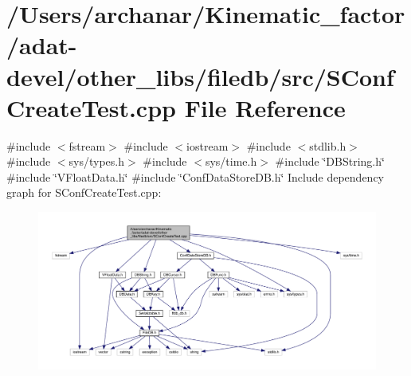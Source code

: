 \hypertarget{adat-devel_2other__libs_2filedb_2src_2SConfCreateTest_8cpp}{}\section{/\+Users/archanar/\+Kinematic\+\_\+factor/adat-\/devel/other\+\_\+libs/filedb/src/\+S\+Conf\+Create\+Test.cpp File Reference}
\label{adat-devel_2other__libs_2filedb_2src_2SConfCreateTest_8cpp}
{\ttfamily \#include $<$fstream$>$}\newline
{\ttfamily \#include $<$iostream$>$}\newline
{\ttfamily \#include $<$stdlib.\+h$>$}\newline
{\ttfamily \#include $<$sys/types.\+h$>$}\newline
{\ttfamily \#include $<$sys/time.\+h$>$}\newline
{\ttfamily \#include \char`\"{}D\+B\+String.\+h\char`\"{}}\newline
{\ttfamily \#include \char`\"{}V\+Float\+Data.\+h\char`\"{}}\newline
{\ttfamily \#include \char`\"{}Conf\+Data\+Store\+D\+B.\+h\char`\"{}}\newline
Include dependency graph for S\+Conf\+Create\+Test.\+cpp\+:
\nopagebreak
\begin{figure}[H]
\begin{center}
\leavevmode
\includegraphics[width=350pt]{d2/d37/adat-devel_2other__libs_2filedb_2src_2SConfCreateTest_8cpp__incl}
\end{center}
\end{figure}
